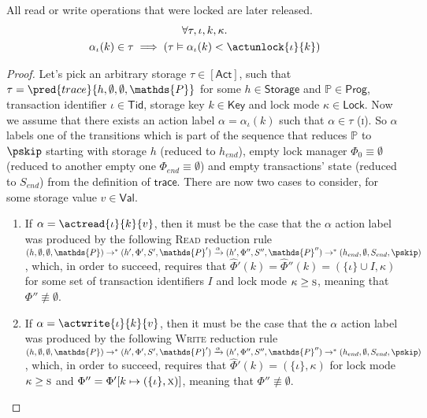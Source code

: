 \lem \label{lem:unlock} All read or write operations that were locked are later released.
\begin{gather*}
\forall \tau, \iota, k, \kappa \ldotp \\
\alpha_\iota(k) \in \tau \implies \left( \tau \vDash \alpha_\iota(k) < \actunlock{\iota}{k} \right)
\end{gather*}

\begin{proof}
Let's pick an arbitrary storage $\tau \in \mathsf{[Act]}$, such that $\tau = \pred{trace}{h, \emptyset, \emptyset, \mathds{P}}$ for some $h \in \mathsf{Storage}$ and $\mathds{P} \in \mathsf{Prog}$, transaction identifier $\iota \in \mathsf{Tid}$, storage key $k \in \mathsf{Key}$ and lock mode $\kappa \in \mathsf{Lock}$. Now we assume that there exists an action label $\alpha = \alpha_\iota(k)$ such that $\alpha \in \tau$ (\textsc{i}). So $\alpha$ labels one of the transitions which is part of the sequence that reduces $\mathds{P}$ to $\pskip$ starting with storage $h$ (reduced to $h_{end}$), empty lock manager $\Phi_0 \equiv \emptyset$ (reduced to another empty one $\Phi_{end} \equiv \emptyset$) and empty transactions' state (reduced to $S_{end}$) from the definition of $\mathsf{trace}$. There are now two cases to consider, for some storage value $v \in \mathsf{Val}$.
\begin{enumerate}
\item If $\alpha = \actread{\iota}{k}{v}$, then it must be the case that the $\alpha$ action label was produced by the following \textsc{Read} reduction rule $(h, \emptyset, \emptyset, \mathds{P}) \rightarrow^* (h', \Phi', S', \mathds{P}') \xrightarrow{\alpha} (h', \Phi'', S'', \mathds{P}'') \rightarrow^* (h_{end}, \emptyset, S_{end}, \pskip)$, which, in order to succeed, requires that $\hat{\Phi}'(k) = \hat{\Phi}''(k) = (\{ \iota \} \cup I, \kappa)$ for some set of transaction identifiers $I$ and lock mode $\kappa \geq \textsc{s}$, meaning that $\Phi'' \not\equiv \emptyset$.
\item If $\alpha = \actwrite{\iota}{k}{v}$, then it must be the case that the $\alpha$ action label was produced by the following \textsc{Write} reduction rule $(h, \emptyset, \emptyset, \mathds{P}) \rightarrow^* (h', \Phi', S', \mathds{P}') \xrightarrow{\alpha} (h', \Phi'', S'', \mathds{P}'') \rightarrow^* (h_{end}, \emptyset, S_{end}, \pskip)$, which, in order to succeed, requires that $\hat{\Phi}'(k) = (\{ \iota \}, \kappa)$ for lock mode $\kappa \geq \textsc{s}$ and $\Phi'' = \Phi'[k \mapsto (\{\iota\}, \textsc{x})]$, meaning that $\Phi'' \not\equiv \emptyset$.
\end{enumerate}


\end{proof}
